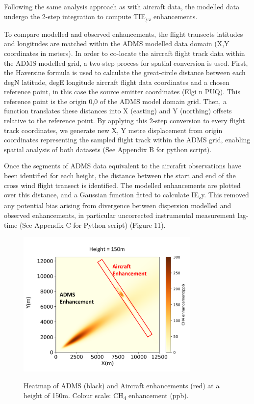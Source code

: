 \documentclass[12pt]{article}
\begin{document}
Following the same analysis approach as with aircraft data, the modelled data undergo the 2-step integration to compute TIE\textsubscript{yz} enhancements.

To compare modelled and observed enhancements, the flight transects latitudes and longitudes are matched within the ADMS modelled data domain (X,Y coordinates in meters). In order to co-locate the aircraft flight track data within the ADMS modelled grid, a two-step process for spatial conversion is used. First, the Haversine formula is used to calculate the great-circle distance between each {degN latitude, degE longitude} aircraft flight data coordinates and a chosen reference point, in this case the source emitter coordinates (Elgi n PUQ). This reference point is the origin {0,0} of the ADMS model domain grid. Then, a function translates these distances into X (easting) and Y (northing) offsets relative to the reference point. By applying this 2-step conversion to every flight track coordinates, we generate new {X, Y} metre displacement from origin coordinates representing the sampled flight track within the ADMS grid, enabling spatial analysis of both datasets (See Appendix B for python script). 

Once the segments of ADMS data equivalent to the aircrafrt observations have been identified for each height, the distance between the start and end of the cross wind flight transect is identified. The modelled enhancements are plotted over this distance, and a Gaussian function fitted to calculate IE\textsubscript{z}y. This removed any potential bias arising from divergence between dispersion modelled and observed enhancements, in particular uncorrected instrumental measurement lag-time (See Appendix C for Python script) (Figure 11). 
\begin{figure}[H]
\centering
\includegraphics[width=0.8\textwidth]{Plots/adms_faam_heatmap.png}
\caption{\label{fig:volume source}} Heatmap of ADMS (black) and Aircraft enhancements (red) at a height of 150m. Colour scale: CH\textsubscript{4} enhancement (ppb).  
\end{figure}
\end{document}
